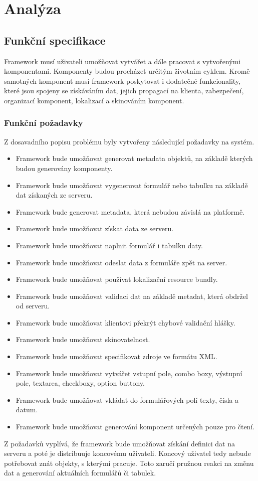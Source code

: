\chapter{Analýza}
\section{Funkční specifikace}
Framework \cite{framework} musí uživateli umožňovat vytvářet a dále pracovat s vytvořenými komponentami. Komponenty budou procházet určitým životním cyklem. Kromě samotných komponent musí framework poskytovat i dodatečné funkcionality, které jsou spojeny se získáváním dat, jejich propagací na klienta, zabezpečení, organizací komponent, lokalizací a skinováním komponent.
\subsection{Funkční požadavky}
Z dosavadního popisu problému byly vytvořeny následující požadavky na systém.
\begin{itemize}
\item Framework bude umožňovat generovat metadata objektů, na základě kterých budou generovány komponenty.
\item Framework bude umožňovat vygenerovat formulář nebo tabulku na základě dat získaných ze serveru.
\item Framework bude generovat metadata, která nebudou závislá na platformě.
\item Framework bude umožňovat získat data ze serveru.
\item Framework bude umožňovat naplnit formulář i tabulku daty.
\item Framework bude umožňovat odeslat data z formuláře zpět na server.
\item Framework bude umožňovat používat lokalizační resource bundly.
\item Framework bude umožňovat validaci dat na základě metadat, která obdržel od serveru.
\item Framework bude umožňovat klientovi překrýt chybové validační hlášky.
\item Framework bude umožňovat skinovatelnost.
\item Framework bude umožňovat specifikovat zdroje ve formátu XML.
\item Framework bude umožňovat vytvářet vstupní pole, combo boxy, výstupní pole, textarea, checkboxy, option buttony.
\item Framework bude umožňovat vkládat do formulářových polí texty, čísla a datum.
\item Framework bude umožňovat generování komponent určených pouze pro čtení. 
\end{itemize} 
Z požadavků vyplívá, že framework bude umožňovat získání definici dat na serveru a poté je distribuuje koncovému uživateli. Koncový uživatel tedy nebude potřebovat znát objekty, s kterými pracuje. Toto zaručí pružnou reakci na změnu dat a generování aktuálních formulářů či tabulek. 
